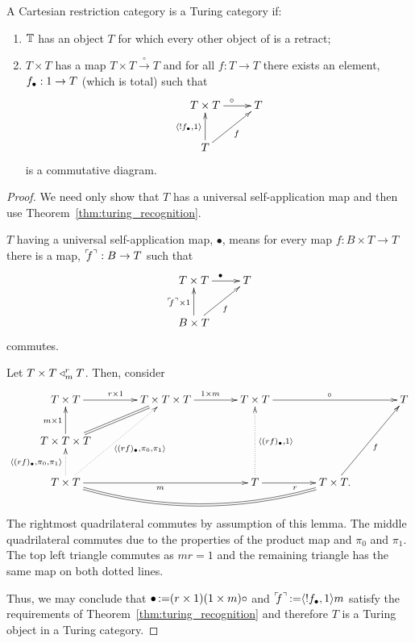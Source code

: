 \begin{lemma}\label{lem:t_t_to_t_gives_a_turing_category}
  A Cartesian restriction category \T is a Turing category if:
  \begin{enumerate}[{(}i{)}]
  \item $\mathbb{T}$ has an object $T$ for which every other object of \T is a retract;
  \item $T\times T$ has a map  $T\times T \xrightarrow{\ \circ\ }T$ and for all
    $f:T\to T$ there exists an element, $f_{\bullet}:1\to T$ (which is total) such that
      \[
        \xymatrix{
          T\times T \ar[r]^{\circ} & T \\
          T \ar[ur]_{f} \ar[u]^{\<!\code{f},1\>}
        }
      \]
    is a commutative diagram.
  \end{enumerate}
\end{lemma}
\begin{proof}
  We need only show that $T$ has a universal self-application map and then use
  Theorem~\ref{thm:turing_recognition}.

  $T$ having a universal self-application map, $\bullet$, means for every map $f:B\times T \to T$ there is a
  map, ${}^\ulcorner\!\!f^\urcorner:B\to T$ such that
  \[
    \xymatrix{
      T\times T \ar[r]^{\bullet} & T \\
      B\times T \ar[ur]_{f} \ar[u]^{\name{f}\times1}
    }
  \]
  commutes.

  Let $T\times T\triangleleft_{m}^{r} T$. Then, consider
  \[
    \xymatrix@C+15pt{
     T\times T \ar[r]^{r\times 1} & T\times T\times T \ar[r]^{1\times m} &T\times T \ar[rr]^{\circ}
       && T \\
     T\times T\times T \ar[u]^{m\times 1} \ar@{=}[ur]\\
     T\times T \ar@{.>}[u]^{\<\code{(r f)},\pi_0,\pi_1\>} \ar@{.>}[uur]_{\<\code{(r f)},\pi_0,\pi_1\>}
       \ar[rr]_{m} \ar@{=}@/_20pt/[rrr]
       & & T \ar[r]_{r} \ar@{.>}[uu]_{\<\code{(r f)},1\>} &T\times T. \ar[uur]_{f}
    }
  \]
  \\[10pt]
  The rightmost quadrilateral commutes by assumption of this lemma. The middle quadrilateral
  commutes due to the properties of the product map and $\pi_0$ and $\pi_1$. The top left triangle
  commutes as $m r = 1$ and the remaining triangle has the same map on both dotted lines.

  Thus, we may conclude that $\bullet \operatorname*{:\!=} (r \times 1)(1\times m) \circ$ and
  ${}^\ulcorner\!\!f^\urcorner\operatorname*{:\!=} \langle!f_{\bullet},1\rangle m$ satisfy the requirements of
  Theorem~\ref{thm:turing_recognition} and therefore $T$ is a Turing object in a Turing category.
\end{proof}
